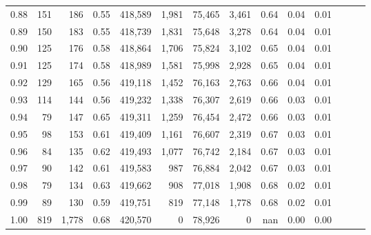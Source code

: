 \begin{tabular}{rrrrrrrrrrrrrr}
0.88 &     151 &    186 &  0.55 &  418,589 &    1,981 &  75,465 &   3,461 &  0.64 &  0.04 &      0.01 \\
0.89 &     150 &    183 &  0.55 &  418,739 &    1,831 &  75,648 &   3,278 &  0.64 &  0.04 &      0.01 \\
0.90 &     125 &    176 &  0.58 &  418,864 &    1,706 &  75,824 &   3,102 &  0.65 &  0.04 &      0.01 \\
0.91 &     125 &    174 &  0.58 &  418,989 &    1,581 &  75,998 &   2,928 &  0.65 &  0.04 &      0.01 \\
0.92 &     129 &    165 &  0.56 &  419,118 &    1,452 &  76,163 &   2,763 &  0.66 &  0.04 &      0.01 \\
0.93 &     114 &    144 &  0.56 &  419,232 &    1,338 &  76,307 &   2,619 &  0.66 &  0.03 &      0.01 \\
0.94 &      79 &    147 &  0.65 &  419,311 &    1,259 &  76,454 &   2,472 &  0.66 &  0.03 &      0.01 \\
0.95 &      98 &    153 &  0.61 &  419,409 &    1,161 &  76,607 &   2,319 &  0.67 &  0.03 &      0.01 \\
0.96 &      84 &    135 &  0.62 &  419,493 &    1,077 &  76,742 &   2,184 &  0.67 &  0.03 &      0.01 \\
0.97 &      90 &    142 &  0.61 &  419,583 &      987 &  76,884 &   2,042 &  0.67 &  0.03 &      0.01 \\
0.98 &      79 &    134 &  0.63 &  419,662 &      908 &  77,018 &   1,908 &  0.68 &  0.02 &      0.01 \\
0.99 &      89 &    130 &  0.59 &  419,751 &      819 &  77,148 &   1,778 &  0.68 &  0.02 &      0.01 \\
1.00 &     819 &  1,778 &  0.68 &  420,570 &        0 &  78,926 &       0 &   nan &  0.00 &      0.00 \\
\bottomrule
\end{tabular}
